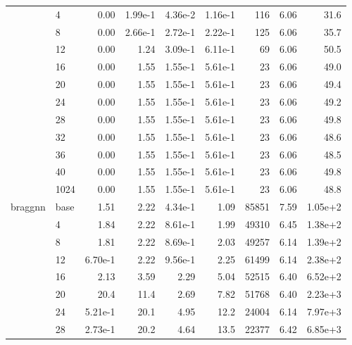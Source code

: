 \begin{longtable}{llrrrrrrr}
\cmidrule{2-9}
         & 4    &   0.00 & 1.99e-1 & 4.36e-2 & 1.16e-1 &     116 &     6.06 & 31.6 \\
\cmidrule{2-9}
         & 8    &   0.00 & 2.66e-1 & 2.72e-1 & 2.22e-1 &     125 &     6.06 & 35.7 \\
\cmidrule{2-9}
         & 12   &   0.00 & 1.24 & 3.09e-1 & 6.11e-1 &      69 &     6.06 & 50.5 \\
\cmidrule{2-9}
         & 16   &   0.00 & 1.55 & 1.55e-1 & 5.61e-1 &      23 &     6.06 & 49.0 \\
\cmidrule{2-9}
         & 20   &   0.00 & 1.55 & 1.55e-1 & 5.61e-1 &      23 &     6.06 & 49.4 \\
\cmidrule{2-9}
         & 24   &   0.00 & 1.55 & 1.55e-1 & 5.61e-1 &      23 &     6.06 & 49.2 \\
\cmidrule{2-9}
         & 28   &   0.00 & 1.55 & 1.55e-1 & 5.61e-1 &      23 &     6.06 & 49.8 \\
\cmidrule{2-9}
         & 32   &   0.00 & 1.55 & 1.55e-1 & 5.61e-1 &      23 &     6.06 & 48.6 \\
\cmidrule{2-9}
         & 36   &   0.00 & 1.55 & 1.55e-1 & 5.61e-1 &      23 &     6.06 & 48.5 \\
\cmidrule{2-9}
         & 40   &   0.00 & 1.55 & 1.55e-1 & 5.61e-1 &      23 &     6.06 & 49.8 \\
\cmidrule{2-9}
         & 1024 &   0.00 & 1.55 & 1.55e-1 & 5.61e-1 &      23 &     6.06 & 48.8 \\
\midrule
braggnn & base &   1.51 & 2.22 & 4.34e-1 & 1.09 &   85851 &     7.59 & 1.05e+2 \\
\cmidrule{2-9}
         & 4    &   1.84 & 2.22 & 8.61e-1 & 1.99 &   49310 &     6.45 & 1.38e+2 \\
\cmidrule{2-9}
         & 8    &   1.81 & 2.22 & 8.69e-1 & 2.03 &   49257 &     6.14 & 1.39e+2 \\
\cmidrule{2-9}
         & 12   &   6.70e-1 & 2.22 & 9.56e-1 & 2.25 &   61499 &     6.14 & 2.38e+2 \\
\cmidrule{2-9}
         & 16   &   2.13 & 3.59 & 2.29 & 5.04 &   52515 &     6.40 & 6.52e+2 \\
\cmidrule{2-9}
         & 20   &   20.4 & 11.4 & 2.69 & 7.82 &   51768 &     6.40 & 2.23e+3 \\
\cmidrule{2-9}
         & 24   &   5.21e-1 & 20.1 & 4.95 & 12.2 &   24004 &     6.14 & 7.97e+3 \\
\cmidrule{2-9}
         & 28   &   2.73e-1 & 20.2 & 4.64 & 13.5 &   22377 &     6.42 & 6.85e+3 \\

\end{longtable}
